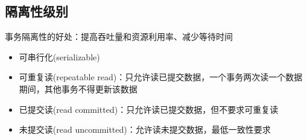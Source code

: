 \subsection{隔离性级别}
事务隔离性的好处：提高吞吐量和资源利用率、减少等待时间
\begin{itemize}
	\item 可串行化(serializable)
	\item 可重复读(repeatable read)：只允许读已提交数据，一个事务两次读一个数据期间，其他事务不得更新该数据
	\item 已提交读(read committed)：只允许读已提交数据，但不要求可重复读
	\item 未提交读(read uncommitted)：允许读未提交数据，最低一致性要求
\end{itemize}